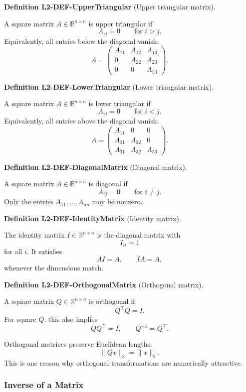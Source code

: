 \documentclass[10pt, letterpaper]{article}
\newcommand{\R}{\mathbb{R}}
\newcommand{\CustomHeading}[3]{%
  \par\medskip\noindent%
  \textbf{#1 #2} \textnormal{(#3)}.\enskip%
}
\newenvironment{DEF}[2]{\CustomHeading{Definition}{#1}{#2}}{}
\begin{document}
\begin{DEF}{L2-DEF-UpperTriangular}{Upper triangular matrix}
A square matrix \(A\in\R^{n\times n}\) is upper triangular if
\[
A_{ij}=0
\qquad
\text{for } i>j.
\]
Equivalently, all entries below the diagonal vanish:
\[
A=
\begin{pmatrix}
A_{11} & A_{12} & A_{13}\\
0 & A_{22} & A_{23}\\
0 & 0 & A_{33}
\end{pmatrix}.
\]
\end{DEF}

\begin{DEF}{L2-DEF-LowerTriangular}{Lower triangular matrix}
A square matrix \(A\in\R^{n\times n}\) is lower triangular if
\[
A_{ij}=0
\qquad
\text{for } i<j.
\]
Equivalently, all entries above the diagonal vanish:
\[
A=
\begin{pmatrix}
A_{11} & 0 & 0\\
A_{21} & A_{22} & 0\\
A_{31} & A_{32} & A_{33}
\end{pmatrix}.
\]
\end{DEF}

\begin{DEF}{L2-DEF-DiagonalMatrix}{Diagonal matrix}
A square matrix \(A\in\R^{n\times n}\) is diagonal if
\[
A_{ij}=0
\qquad
\text{for } i\neq j.
\]
Only the entries \(A_{11},\dots,A_{nn}\) may be nonzero.
\end{DEF}

\begin{DEF}{L2-DEF-IdentityMatrix}{Identity matrix}
The identity matrix \(I\in\R^{n\times n}\) is the diagonal matrix with
\[
I_{ii}=1
\]
for all \(i\). It satisfies
\[
AI=A,
\qquad
IA=A,
\]
whenever the dimensions match.
\end{DEF}

\begin{DEF}{L2-DEF-OrthogonalMatrix}{Orthogonal matrix}
A square matrix \(Q\in\R^{n\times n}\) is orthogonal if
\[
Q^\top Q=I.
\]
For square \(Q\), this also implies
\[
QQ^\top=I,
\qquad
Q^{-1}=Q^\top.
\]
\end{DEF}

Orthogonal matrices preserve Euclidean lengths:
\[
\|Qx\|_2=\|x\|_2.
\]
This is one reason why orthogonal transformations are numerically attractive.

\subsubsection{Inverse of a Matrix}
\end{document}
